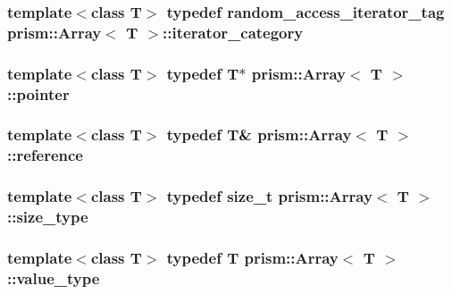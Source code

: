 \subsubsection[{\texorpdfstring{iterator\+\_\+category}{iterator_category}}]{\setlength{\rightskip}{0pt plus 5cm}template$<$class T$>$ typedef {\bf random\+\_\+access\+\_\+iterator\+\_\+tag} {\bf prism\+::\+Array}$<$ T $>$\+::{\bf iterator\+\_\+category}}\hypertarget{classprism_1_1_array_a68b5c70152e822463f8d2a3c0c5bebcb}{}\label{classprism_1_1_array_a68b5c70152e822463f8d2a3c0c5bebcb}
\subsubsection[{\texorpdfstring{pointer}{pointer}}]{\setlength{\rightskip}{0pt plus 5cm}template$<$class T$>$ typedef T$\ast$ {\bf prism\+::\+Array}$<$ T $>$\+::{\bf pointer}}\hypertarget{classprism_1_1_array_a391b8bb39ab945786ca33a0110fc163c}{}\label{classprism_1_1_array_a391b8bb39ab945786ca33a0110fc163c}
\subsubsection[{\texorpdfstring{reference}{reference}}]{\setlength{\rightskip}{0pt plus 5cm}template$<$class T$>$ typedef T\& {\bf prism\+::\+Array}$<$ T $>$\+::{\bf reference}}\hypertarget{classprism_1_1_array_a1ebfd26a4f219fcb24eb7f068704d9aa}{}\label{classprism_1_1_array_a1ebfd26a4f219fcb24eb7f068704d9aa}
\subsubsection[{\texorpdfstring{size\+\_\+type}{size_type}}]{\setlength{\rightskip}{0pt plus 5cm}template$<$class T$>$ typedef size\+\_\+t {\bf prism\+::\+Array}$<$ T $>$\+::{\bf size\+\_\+type}}\hypertarget{classprism_1_1_array_a8ceacda8c2a68bf5b54e07a8c4f5f8e3}{}\label{classprism_1_1_array_a8ceacda8c2a68bf5b54e07a8c4f5f8e3}
\subsubsection[{\texorpdfstring{value\+\_\+type}{value_type}}]{\setlength{\rightskip}{0pt plus 5cm}template$<$class T$>$ typedef T {\bf prism\+::\+Array}$<$ T $>$\+::{\bf value\+\_\+type}}\hypertarget{classprism_1_1_array_a7b6dc8358fdfe216f4477a361190c9af}{}\label{classprism_1_1_array_a7b6dc8358fdfe216f4477a361190c9af}


